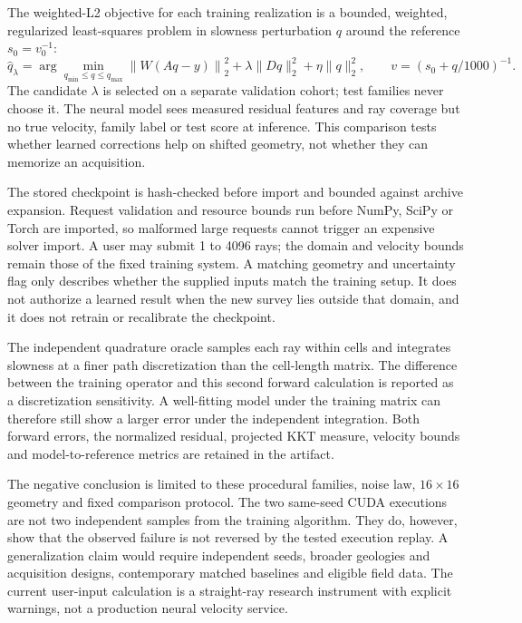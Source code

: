 The weighted-L2 objective for each training realization is a bounded,
weighted, regularized least-squares problem in slowness perturbation
\(q\) around the reference \(s_0=v_0^{-1}\):
\begin{equation}\label{eq:velocity-l2}
 \widehat q_\lambda=\arg\min_{q_{\min}\leq q\leq q_{\max}}
 \left\|W(Aq-y)\right\|_2^2+
 \lambda\|Dq\|_2^2+\eta\|q\|_2^2,\qquad
 v=(s_0+q/1000)^{-1}.
\end{equation}
The candidate \(\lambda\) is selected on a separate validation cohort;
test families never choose it. The neural model sees measured residual
features and ray coverage but no true velocity, family label or test
score at inference. This comparison tests whether learned corrections
help on shifted geometry, not whether they can memorize an acquisition.

The stored checkpoint is hash-checked before import and bounded against
archive expansion. Request validation and resource bounds run before
NumPy, SciPy or Torch are imported, so malformed large requests cannot
trigger an expensive solver import. A user may submit 1 to 4096 rays;
the domain and velocity bounds remain those of the fixed training
system. A matching geometry and uncertainty flag only describes whether
the supplied inputs match the training setup. It does not authorize a
learned result when the new survey lies outside that domain, and it
does not retrain or recalibrate the checkpoint.

The independent quadrature oracle samples each ray within cells and
integrates slowness at a finer path discretization than the cell-length
matrix. The difference between the training operator and this second
forward calculation is reported as a discretization sensitivity. A
well-fitting model under the training matrix can therefore still show
a larger error under the independent integration. Both forward errors,
the normalized residual, projected KKT measure, velocity bounds and
model-to-reference metrics are retained in the artifact.

The negative conclusion is limited to these procedural families,
noise law, \(16\times16\) geometry and fixed comparison protocol. The
two same-seed CUDA executions are not two independent samples from the
training algorithm. They do, however, show that the observed failure is
not reversed by the tested execution replay. A generalization claim
would require independent seeds, broader geologies and acquisition
designs, contemporary matched baselines and eligible field data. The
current user-input calculation is a straight-ray research instrument
with explicit warnings, not a production neural velocity service.

